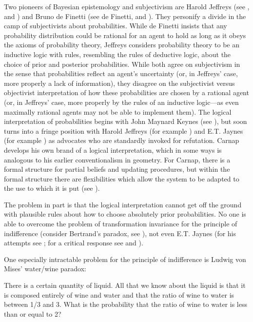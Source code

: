 \documentclass[phd,12pt,oneside]{ubcthesis}
\begin{document}
Two pioneers of Bayesian epistemology and subjectivism are Harold
Jeffreys (see , and )
and Bruno de Finetti (see de Finetti,  and
). They personify a divide in the camp of
subjectivists about probabilities. While de Finetti insists that any
probability distribution could be rational for an agent to hold as
long as it obeys the axioms of probability theory, Jeffreys considers
probability theory to be an inductive logic with rules, resembling the
rules of deductive logic, about the choice of prior and posterior
probabilities. While both agree on subjectivism in the sense that
probabilities reflect an agent's uncertainty (or, in Jeffreys' case,
more properly a lack of information), they disagree on the
subjectivist versus objectivist interpretation of how these
probabilities are chosen by a rational agent (or, in Jeffreys' case,
more properly by the rules of an inductive logic---as even maximally
rational agents may not be able to implement them). The logical
interpretation of probabilities begins with John Maynard Keynes (see
), but soon turns into a fringe position with
Harold Jeffreys (for example ) and E.T. Jaynes
(for example ) as advocates who are
standardly invoked for refutation. Carnap develops his own brand of a
logical interpretation, which in some ways is analogous to his earlier
conventionalism in geometry. For Carnap, there is a formal structure
for partial beliefs and updating procedures, but within the formal
structure there are flexibilities which allow the system to be adapted
to the use to which it is put (see ).

The problem in part is that the logical interpretation cannot get off
 the ground with plausible rules about how to choose absolutely prior
probabilities. No one is able to overcome the problem of
transformation invariance for the principle of indifference (consider
Bertrand's paradox, see ), not even E.T. Jaynes
(for his attempts see ; for a critical response
see  and ).

One especially intractable problem for the principle of indifference
is Ludwig von Mises' water/wine paradox:

\begin{quotex}
  \label{ex:waterwine} There is a
  certain quantity of liquid. All that we know about the liquid is
  that it is composed entirely of wine and water and that the ratio of
  wine to water is between 1/3 and 3. What is the probability that the
  ratio of wine to water is less than or equal to 2?
\end{quotex}
\end{document}
